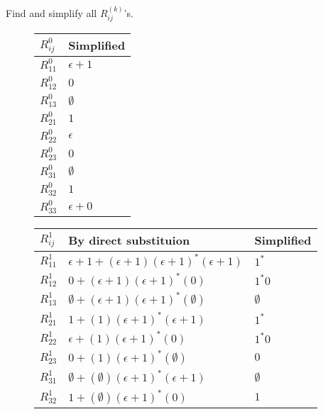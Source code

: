 \documentclass[12pt]{article}
\begin{document}
Find and simplify all $R_{ij}^{(k)}$'s.

\begin{figure}[ht]
    \begin{tabular}{l||l}
        $R_{ij}^{0}$ & Simplified     \\
        \hline
        $R_{11}^{0}$ & $\epsilon + 1$ \\
        \hline
        $R_{12}^{0}$ & $0$            \\
        \hline
        $R_{13}^{0}$ & $\emptyset$    \\
        \hline
        $R_{21}^{0}$ & $1$            \\
        \hline
        $R_{22}^{0}$ & $\epsilon$     \\
        \hline
        $R_{23}^{0}$ & $0$            \\
        \hline
        $R_{31}^{0}$ & $\emptyset$    \\
        \hline
        $R_{32}^{0}$ & $1$            \\
        \hline
        $R_{33}^{0}$ & $\epsilon + 0$ \\
    \end{tabular}
    \begin{tabular}{l||l|l}
        $R_{ij}^{1}$ & By direct substituion                                         & Simplified       \\
        \hline
        $R_{11}^{1}$ & $\epsilon + 1 + (\epsilon + 1)(\epsilon + 1)^*(\epsilon + 1)$ & $1^*$            \\
        \hline
        $R_{12}^{1}$ & $0 + (\epsilon + 1)(\epsilon + 1)^*(0)$                       & $1^*0$           \\
        \hline
        $R_{13}^{1}$ & $\emptyset + (\epsilon + 1)(\epsilon + 1)^*(\emptyset)$       & $\emptyset$      \\
        \hline
        $R_{21}^{1}$ & $1 + (1)(\epsilon + 1)^*(\epsilon + 1)$                       & $1^*$            \\
        \hline
        $R_{22}^{1}$ & $\epsilon + (1)(\epsilon + 1)^*(0)$                           & $1^*0$           \\
        \hline
        $R_{23}^{1}$ & $0 + (1)(\epsilon + 1)^*(\emptyset)$                          & $0$              \\
        \hline
        $R_{31}^{1}$ & $\emptyset + (\emptyset)(\epsilon + 1)^*(\epsilon + 1)$       & $\emptyset$      \\
        \hline
        $R_{32}^{1}$ & $1 + (\emptyset)(\epsilon + 1)^*(0)$                          & $1$              \\

\end{tabular}
\end{figure}
\end{document}
